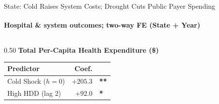 \documentclass[aspectratio=169,11pt]{beamer}
\newcommand{\emphcolor}[1]{{\color{WarmOrange}\textbf{#1}}}
\newcommand{\tealtext}[1]{{\color{Teal}#1}}
\begin{document}
\begin{frame}{State: Cold Raises System Costs; Drought Cuts Public Payer Spending}
  \framesubtitle{Hospital \& system outcomes; two-way FE (State + Year)}
  \small
  \begin{columns}[T]
    \begin{column}{0.50\textwidth}
      \tealtext{\textbf{Total Per-Capita Health Expenditure (\$)}}\\[0.25em]
      \begin{tabular}{lrl}
        \toprule
        Predictor & Coef. & \\
        \midrule
        Cold Shock ($h{=}0$)   & $+205.3$ & \emphcolor{**} \\
        High HDD (lag 2)       & $+92.0$  & \emphcolor{*}  \\
        \bottomrule
      \end{tabular}
      \vspace{0.45em}


\end{column}
\end{columns}
\end{frame}
\end{document}
